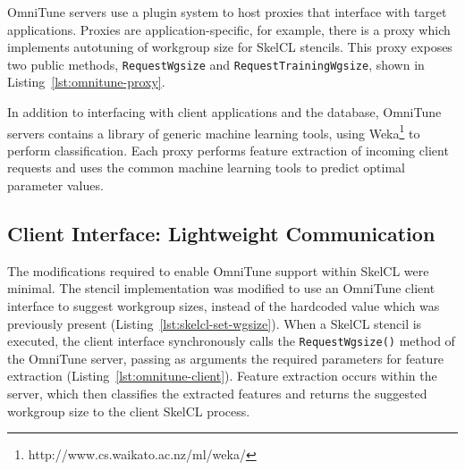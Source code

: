 OmniTune servers use a plugin system to host proxies that interface
with target applications. Proxies are application-specific, for
example, there is a proxy which implements autotuning of workgroup
size for SkelCL stencils. This proxy exposes two public methods,
\texttt{RequestWgsize} and \texttt{RequestTrainingWgsize}, shown in
Listing~\ref{lst:omnitune-proxy}.

In addition to interfacing with client applications and the database,
OmniTune servers contains a library of generic machine learning tools,
using Weka\footnote{http://www.cs.waikato.ac.nz/ml/weka/} to perform
classification. Each proxy performs feature extraction of incoming
client requests and uses the common machine learning tools to predict
optimal parameter values.




\subsection{Client Interface: Lightweight Communication}

The modifications required to enable OmniTune support within SkelCL
were minimal. The stencil implementation was modified to use an
OmniTune client interface to suggest workgroup sizes, instead of the
hardcoded value which was previously present
(Listing~\ref{lst:skelcl-set-wgsize}). When a SkelCL stencil is
executed, the client interface synchronously calls the
\texttt{RequestWgsize()} method of the OmniTune server, passing as
arguments the required parameters for feature extraction
(Listing~\ref{lst:omnitune-client}). Feature extraction occurs within
the server, which then classifies the extracted features and returns
the suggested workgroup size to the client SkelCL process.




